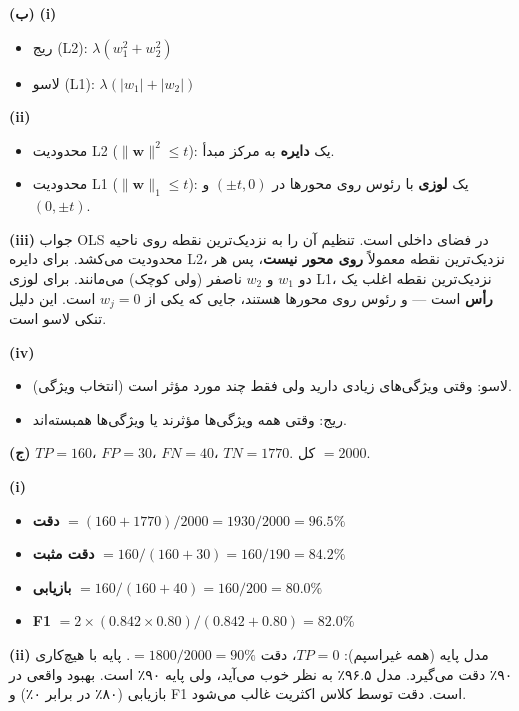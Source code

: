 \documentclass[12pt,a4paper]{article}
\begin{document}
\bigskip

\textbf{(ب)} \textbf{(i)}
\begin{itemize}
\item ریج (L2): $\lambda(w_1^2 + w_2^2)$
\item لاسو (L1): $\lambda(|w_1| + |w_2|)$
\end{itemize}

\textbf{(ii)}
\begin{itemize}
\item محدودیت L2 ($\|\mathbf{w}\|^2 \leq t$): یک \textbf{دایره} به مرکز مبدأ.
\item محدودیت L1 ($\|\mathbf{w}\|_1 \leq t$): یک \textbf{لوزی} با رئوس روی محورها در $(\pm t, 0)$ و $(0, \pm t)$.
\end{itemize}

\textbf{(iii)} جواب OLS در فضای داخلی است. تنظیم آن را به نزدیک‌ترین نقطه روی ناحیه محدودیت می‌کشد. برای دایره L2، نزدیک‌ترین نقطه معمولاً \textbf{روی محور نیست}، پس هر دو $w_1$ و $w_2$ ناصفر (ولی کوچک) می‌مانند. برای لوزی L1، نزدیک‌ترین نقطه اغلب یک \textbf{رأس} است — و رئوس روی محورها هستند، جایی که یکی از $w_j = 0$ است. این دلیل تنکی لاسو است.

\textbf{(iv)}
\begin{itemize}
\item لاسو: وقتی ویژگی‌های زیادی دارید ولی فقط چند مورد مؤثر است (انتخاب ویژگی).
\item ریج: وقتی همه ویژگی‌ها مؤثرند یا ویژگی‌ها همبسته‌اند.
\end{itemize}

\bigskip

\textbf{(ج)} $TP = 160$، $FP = 30$، $FN = 40$، $TN = 1770$. کل $= 2000$.

\textbf{(i)}
\begin{itemize}
\item \textbf{دقت} $= (160 + 1770)/2000 = 1930/2000 = 96.5\%$
\item \textbf{دقت مثبت} $= 160/(160+30) = 160/190 = 84.2\%$
\item \textbf{بازیابی} $= 160/(160+40) = 160/200 = 80.0\%$
\item \textbf{F1} $= 2 \times (0.842 \times 0.80)/(0.842 + 0.80) = 82.0\%$
\end{itemize}

\textbf{(ii)} مدل پایه (همه غیراسپم): $TP = 0$، دقت $= 1800/2000 = 90\%$. پایه با هیچ‌کاری ۹۰٪ دقت می‌گیرد. مدل ۹۶.۵٪ به نظر خوب می‌آید، ولی پایه ۹۰٪ است. بهبود واقعی در بازیابی (۸۰٪ در برابر ۰٪) و F1 است. دقت توسط کلاس اکثریت غالب می‌شود.
\end{document}
